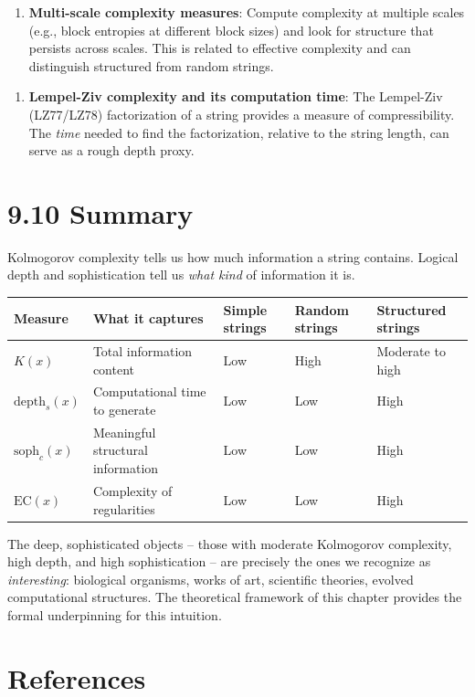 \begin{enumerate}
  \item \textbf{Multi-scale complexity measures}: Compute complexity at multiple scales (e.g., block entropies at different block sizes) and look for structure that persists across scales. This is related to effective complexity and can distinguish structured from random strings.
\end{enumerate}

\begin{enumerate}
  \item \textbf{Lempel-Ziv complexity and its computation time}: The Lempel-Ziv (LZ77/LZ78) factorization of a string provides a measure of compressibility. The \textit{time} needed to find the factorization, relative to the string length, can serve as a rough depth proxy.
\end{enumerate}

\section{9.10 Summary}

Kolmogorov complexity tells us how much information a string contains. Logical depth and sophistication tell us \textit{what kind} of information it is.

\begin{tabular}{|l|l|l|l|l|}
\hline
Measure & What it captures & Simple strings & Random strings & Structured strings \\
\hline
$K(x)$ & Total information content & Low & High & Moderate to high \\
$\text{depth}_s(x)$ & Computational time to generate & Low & Low & High \\
$\text{soph}_c(x)$ & Meaningful structural information & Low & Low & High \\
$\text{EC}(x)$ & Complexity of regularities & Low & Low & High \\
\hline
\end{tabular}


The deep, sophisticated objects -- those with moderate Kolmogorov complexity, high depth, and high sophistication -- are precisely the ones we recognize as \textit{interesting}: biological organisms, works of art, scientific theories, evolved computational structures. The theoretical framework of this chapter provides the formal underpinning for this intuition.

\section{References}

